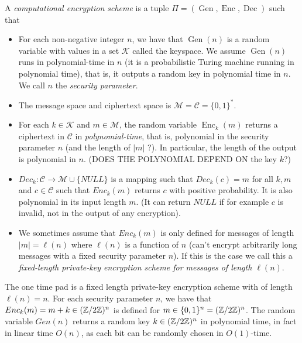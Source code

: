 \documentclass[twoside, a4paper, 10pt]{amsart}
\begin{document}
\begin{mydef} A \textit{computational encryption scheme} is a tuple $\Pi = (\operatorname{Gen}, \operatorname{Enc}, \operatorname{Dec})$ such that

\begin{itemize}
	\item For each non-negative integer $n$, we have that $\operatorname{Gen}(n)$ is a random variable with values in a set $\mathcal{K}$ called the keyspace. We assume $\operatorname{Gen}(n)$ runs in polynomial-time in $n$ (it is a probabilistic Turing machine running in polynomial time), that is, it outputs a random key in polynomial time in $n$. We call $n$ the \textit{security parameter}.
	\item The message space and ciphertext space is $\mathcal{M} = \mathcal{C} = \{0,1\}^*$.
	\item For each $k \in \mathcal{K}$ and $m \in \mathcal{M}$, the random variable $\operatorname{Enc}_k(m)$ returns a ciphertext in $\mathcal{C}$ in \textit{polynomial-time}, that is, polynomial in the security parameter $n$ (and the length of $|m|$ ?). In particular, the length of the output is polynomial in $n$. (DOES THE POLYNOMIAL DEPEND ON the key $k$?)
	\item $Dec_k:\mathcal{C} \to \mathcal{M} \cup \{ NULL \}$ is a mapping such that $Dec_k(c) = m$ for all $k, m$ and $c \in \mathcal{C}$ such that $Enc_k(m)$ returns $c$ with positive probability. It is also polynomial in its input length $m$. (It can return $NULL$ if for example $c$ is invalid, not in the output of any encryption).
	\item We sometimes assume that $Enc_k(m)$ is only defined for messages of length $|m| = \ell(n)$ where $\ell(n)$ is a function of $n$ (can't encrypt arbitrarily long messages with a fixed security parameter $n$). If this is the case we call this a \textit{fixed-length private-key encryption scheme for messages of length $\ell(n)$}.
\end{itemize}

\end{mydef}

\begin{eg} The one time pad is a fixed length private-key encryption scheme with of length $\ell(n)=n$. For each security parameter $n$, we have that $Enc_k(m) = m+k \in (\mathbb{Z}/2\mathbb{Z})^n$ is defined for $m \in \{0,1\}^n = (\mathbb{Z}/2\mathbb{Z})^n$. The random variable $Gen(n)$ returns a random key $k \in (\mathbb{Z}/2\mathbb{Z})^n$ in polynomial time, in fact in linear time $O(n)$, as each bit can be randomly chosen in $O(1)$-time.

\end{eg}
\end{document}
